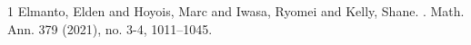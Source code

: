 \begin{thebibliography}{1}
Elmanto, Elden and Hoyois, Marc and Iwasa, Ryomei and Kelly, Shane.
.
\newblock Math. Ann. 379 (2021), no. 3-4, 1011--1045.
\end{thebibliography}
